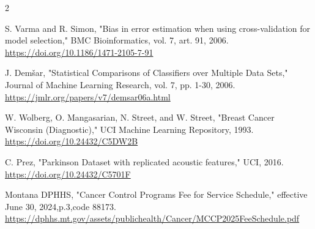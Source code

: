 \documentclass[10pt,a4paper]{article}
\begin{document}
\begin{multicols}{2}
\begin{minipage}{\linewidth}{\fontsize{7}{8.2}\selectfont [13] S. Varma and R. Simon, "Bias in error estimation when using cross-validation for model selection," BMC Bioinformatics, vol. 7, art. 91, 2006. \url{https://doi.org/10.1186/1471-2105-7-91}\par}\end{minipage}\par
\begin{minipage}{\linewidth}{\fontsize{7}{8.2}\selectfont [14] J. Demšar, "Statistical Comparisons of Classifiers over Multiple Data Sets," Journal of Machine Learning Research, vol. 7, pp. 1-30, 2006. \url{https://jmlr.org/papers/v7/demsar06a.html}\par}\end{minipage}\par
\begin{minipage}{\linewidth}{\fontsize{7}{8.2}\selectfont [15] W. Wolberg, O. Mangasarian, N. Street, and W. Street, "Breast Cancer Wisconsin (Diagnostic)," UCI Machine Learning Repository, 1993. \url{https://doi.org/10.24432/C5DW2B}\par}\end{minipage}\par
\begin{minipage}{\linewidth}{\fontsize{7}{8.2}\selectfont [16] C. Prez, "Parkinson Dataset with replicated acoustic features," UCI, 2016. \url{https://doi.org/10.24432/C5701F}\par}\end{minipage}\par
\begin{minipage}{\linewidth}{\fontsize{7}{8.2}\selectfont [17] Montana DPHHS, "Cancer Control Programs Fee for Service Schedule," effective June 30, 2024,p.3,code 88173. \url{https://dphhs.mt.gov/assets/publichealth/Cancer/MCCP2025FeeSchedule.pdf}\par}\end{minipage}\par
\end{multicols}
\end{document}
